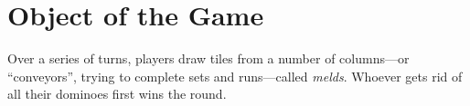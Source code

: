 \section{Object of the Game}
Over a series of turns, players draw tiles from a number of columns---or ``conveyors'', trying to complete sets and runs---called \textit{melds}.
Whoever gets rid of all their dominoes first wins the round.
